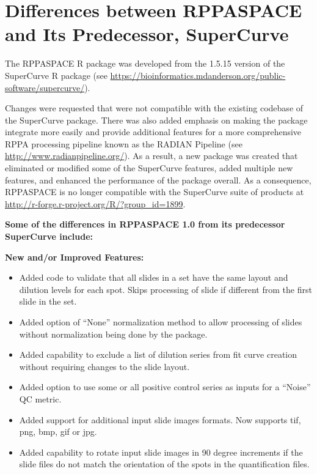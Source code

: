 \documentclass[
]{article}
\providecommand{\tightlist}{%
  \setlength{\itemsep}{0pt}\setlength{\parskip}{0pt}}
\begin{document}
\hypertarget{vs_supercurve}{%
\section{Differences between RPPASPACE and Its Predecessor,
SuperCurve}\label{vs_supercurve}}

The RPPASPACE R package was developed from the 1.5.15 version of the
SuperCurve R package (see
\url{https://bioinformatics.mdanderson.org/public-software/supercurve/}).

Changes were requested that were not compatible with the existing
codebase of the SuperCurve package. There was also added emphasis on
making the package integrate more easily and provide additional features
for a more comprehensive RPPA processing pipeline known as the RADIAN
Pipeline (see \url{http://www.radianpipeline.org/}). As a result, a new
package was created that eliminated or modified some of the SuperCurve
features, added multiple new features, and enhanced the performance of
the package overall. As a consequence, RPPASPACE is no longer compatible
with the SuperCurve suite of products at
\url{http://r-forge.r-project.org/R/?group_id=1899}.

\textbf{Some of the differences in RPPASPACE 1.0 from its predecessor
SuperCurve include:}

\textbf{New and/or Improved Features:}

\begin{itemize}
\tightlist
\item
  Added code to validate that all slides in a set have the same layout
  and dilution levels for each spot. Skips processing of slide if
  different from the first slide in the set.
\item
  Added option of ``None'' normalization method to allow processing of
  slides without normalization being done by the package.
\item
  Added capability to exclude a list of dilution series from fit curve
  creation without requiring changes to the slide layout.
\item
  Added option to use some or all positive control series as inputs for
  a ``Noise'' QC metric.
\item
  Added support for additional input slide images formats. Now supports
  tif, png, bmp, gif or jpg.
\item
  Added capability to rotate input slide images in 90 degree increments
  if the slide files do not match the orientation of the spots in the
  quantification files.
\end{itemize}
\end{document}
